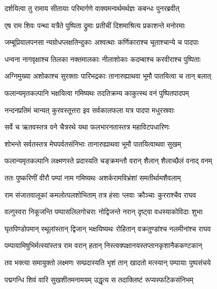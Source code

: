 
\twolineshloka
{दर्शयित्वा तु रामाय सीतायाः परिमार्गणे}
{वाक्यमन्वर्थमर्थज्ञः कबन्धः पुनरब्रवीत्} %

\twolineshloka
{एष राम शिवः पन्था यत्रैते पुष्पिता द्रुमाः}
{प्रतीचीं दिशमाश्रित्य प्रकाशन्ते मनोरमाः} %

\twolineshloka
{जम्बूप्रियालपनसा न्यग्रोधप्लक्षतिन्दुकाः}
{अश्वत्थाः कर्णिकाराश्च चूताश्चान्ये च पादपाः} %

\twolineshloka
{धन्वना नागवृक्षाश्च तिलका नक्तमालकाः}
{नीलाशोकाः कदम्बाश्च करवीराश्च पुष्पिताः} %

\twolineshloka
{अग्निमुख्या अशोकाश्च सुरक्ताः पारिभद्रकाः}
{तानारुह्याथवा भूमौ पातयित्वा च तान् बलात्} %

\twolineshloka
{फलान्यमृतकल्पानि भक्षयित्वा गमिष्यथः}
{तदतिक्रम्य काकुत्स्थ वनं पुष्पितपादपम्} %

\twolineshloka
{नन्दनप्रतिमं चान्यत् कुरवस्तूत्तरा इव}
{सर्वकालफला यत्र पादपा मधुरस्रवाः} %

\twolineshloka
{सर्वे च ऋतवस्तत्र वने चैत्ररथे यथा}
{फलभारनतास्तत्र महाविटपधारिणः} %

\twolineshloka
{शोभन्ते सर्वतस्तत्र मेघपर्वतसंनिभाः}
{तानारुह्याथवा भूमौ पातयित्वाथवा सुखम्} %

\twolineshloka
{फलान्यमृतकल्पानि लक्ष्मणस्ते प्रदास्यति}
{चङ्क्रमन्तौ वरान् शैलान् शैलाच्छैलं वनाद् वनम्} %

\twolineshloka
{ततः पुष्करिणीं वीरौ पम्पां नाम गमिष्यथः}
{अशर्करामविभ्रंशां समतीर्थामशैवलाम्} %

\twolineshloka
{राम संजातवालूकां कमलोत्पलशोभिताम्}
{तत्र हंसाः प्लवाः क्रौञ्चाः कुरराश्चैव राघव} %

\twolineshloka
{वल्गुस्वरा निकूजन्ति पम्पासलिलगोचराः}
{नोद्विजन्ते नरान् दृष्ट्वा वधस्याकोविदाः शुभाः} %

\twolineshloka
{घृतपिण्डोपमान् स्थूलांस्तान् द्विजान् भक्षयिष्यथः}
{रोहितान् वक्रतुण्डांश्च नलमीनांश्च राघव} %

\twolineshloka
{पम्पायामिषुभिर्मत्स्यांस्तत्र राम वरान् हतान्}
{निस्त्वक्पक्षानयस्तप्तानकृशानैककण्टकान्} %

\twolineshloka
{तव भक्त्या समायुक्तो लक्ष्मणः सम्प्रदास्यति}
{भृशं तान् खादतो मत्स्यान् पम्पायाः पुष्पसंचये} %

\twolineshloka
{पद्मगन्धि शिवं वारि सुखशीतमनामयम्}
{उद्धृत्य स तदाक्लिष्टं रूप्यस्फटिकसंनिभम्} %

